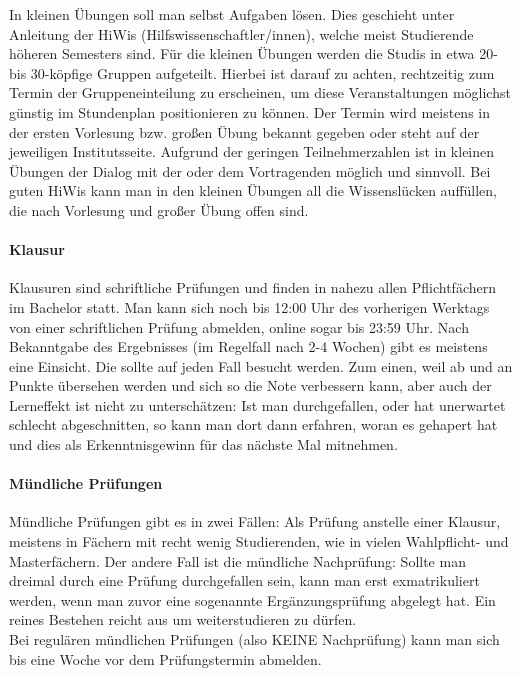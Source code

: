 	In kleinen Übungen soll man selbst Aufgaben lösen. Dies geschieht unter Anleitung der HiWis (Hilfswissenschaftler/innen), welche meist Studierende höheren Semesters sind. Für die kleinen Übungen werden die Studis in etwa 20- bis 30-köpfige Gruppen aufgeteilt. Hierbei ist darauf zu achten, rechtzeitig zum Termin der Gruppeneinteilung zu erscheinen, um diese Veranstaltungen möglichst günstig im Stundenplan positionieren zu können. Der Termin wird meistens in der ersten Vorlesung bzw. großen Übung bekannt gegeben oder steht auf der jeweiligen Institutsseite. Aufgrund der geringen Teilnehmerzahlen ist in kleinen Übungen der Dialog mit der oder dem Vortragenden möglich und sinnvoll. Bei guten HiWis kann man in den kleinen Übungen all die Wissenslücken auffüllen, die nach Vorlesung und großer Übung offen sind.
	
	\paragraph*{Klausur}
	Klausuren sind schriftliche Prüfungen und finden in nahezu allen Pflichtfächern im Bachelor statt. Man kann sich noch bis 12:00 Uhr des vorherigen Werktags von einer schriftlichen Prüfung abmelden, online sogar bis 23:59 Uhr. Nach Bekanntgabe des Ergebnisses (im Regelfall nach 2-4 Wochen) gibt es meistens eine Einsicht. Die sollte auf jeden Fall besucht werden. Zum einen, weil ab und an Punkte übersehen werden und sich so die Note verbessern kann, aber auch der Lerneffekt ist nicht zu unterschätzen: Ist man durchgefallen, oder hat unerwartet schlecht abgeschnitten, so kann man dort dann erfahren, woran es gehapert hat und dies als Erkenntnisgewinn für das nächste Mal mitnehmen.

	\paragraph*{Mündliche Prüfungen}
	Mündliche Prüfungen gibt es in zwei Fällen: Als Prüfung anstelle einer Klausur, meistens in Fächern mit recht wenig Studierenden, wie in vielen Wahlpflicht- und Masterfächern. 
	Der andere Fall ist die mündliche Nachprüfung: Sollte man dreimal durch eine Prüfung durchgefallen sein, kann man erst exmatrikuliert werden, wenn man zuvor eine sogenannte Ergänzungsprüfung abgelegt hat. Ein reines Bestehen reicht aus um weiterstudieren zu dürfen.\\
	Bei regulären mündlichen Prüfungen (also KEINE Nachprüfung) kann man sich bis eine Woche vor dem Prüfungstermin abmelden.

